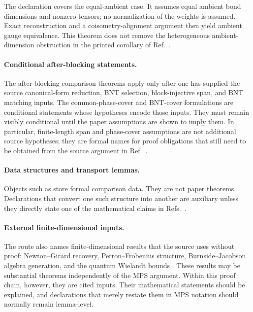 \documentclass{article}
\begin{document}
The declaration
covers the equal-ambient case. It assumes equal ambient bond dimensions and
nonzero tensors; no normalization of the weights is assumed. Exact
reconstruction and a coisometry-alignment argument then yield ambient gauge
equivalence. This theorem does not remove the heterogeneous
ambient-dimension obstruction in the printed corollary of
Ref.~\cite{Cirac2016MPDO_arXiv}.

\paragraph{Conditional after-blocking statements.}
The after-blocking comparison theorems apply only after one has supplied the
source canonical-form reduction, BNT selection, block-injective span, and BNT
matching inputs. The common-phase-cover and BNT-cover formulations are
conditional statements whose hypotheses encode those inputs. They must remain
visibly conditional until the paper assumptions are shown to imply them. In
particular, finite-length span and phase-cover assumptions are not additional
source hypotheses; they are formal names for proof obligations that still need
to be obtained from the source argument in
Ref.~\cite{Cirac2016MPDO_arXiv}.

\paragraph{Data structures and transport lemmas.}
Objects such as  store formal
comparison data. They are not paper theorems. Declarations that convert one
such structure into another are auxiliary unless they directly state one of
the mathematical claims in Refs.~\cite{Cirac2016MPDO_arXiv,Cirac2021Matrix}.

\paragraph{External finite-dimensional inputs.}
The route also names finite-dimensional results that the source uses without
proof: Newton--Girard recovery, Perron--Frobenius structure, Burnside--Jacobson
algebra generation, and the quantum Wielandt bounds
\cite{Cirac2016MPDO_arXiv,Sanz2010Quantum}. These results may be substantial
theorems independently of the MPS argument. Within this proof chain, however,
they are cited inputs. Their mathematical statements should be explained, and
declarations that merely restate them in MPS notation should normally remain
lemma-level.
\end{document}
